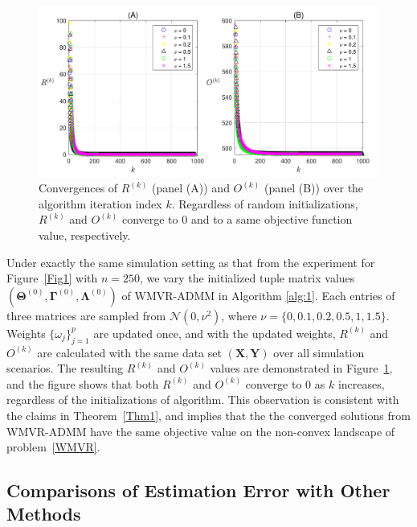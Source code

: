 \documentclass[alpha-refs]{wiley-article}
\begin{document}
\begin{figure} [t!]
  \includegraphics[width=120mm]{Figure/Fig4.pdf}
  \centering
  \caption{Convergences of $R^{(k)}$ (panel (A)) and $O^{(k)}$ (panel (B)) over the algorithm iteration index $k$.
  Regardless of random initializations, $R^{(k)}$ and $O^{(k)}$ converge to $0$ and to a same objective function value, respectively.}
  \label{Fig4}
\end{figure}

Under exactly the same simulation setting as that from the experiment for Figure~\ref{Fig1} with $n=250$, we vary the initialized tuple matrix values $(\boldsymbol{\Theta}^{(0)},\boldsymbol{\Gamma}^{(0)},\boldsymbol{\Lambda}^{(0)})$ of WMVR-ADMM in Algorithm \ref{alg:1}. Each entries of three matrices are sampled from $\mathcal{N}(0,\nu^{2})$, where $\nu=\{0,0.1,0.2,0.5,1,1.5\}$. Weights $\{\omega_j\}_{j=1}^{p}$ are updated once, and with the updated weights, $R^{(k)}$ and $O^{(k)}$ are calculated with the same data set $(\boldsymbol{X},\boldsymbol{Y})$ over all simulation scenarios. The resulting  $R^{(k)}$ and $O^{(k)}$ values are demonstrated in Figure~\ref{Fig4}, and the figure shows that both $R^{(k)}$ and $O^{(k)}$ converge to 0 as $k$ increases, regardless of the initializations of algorithm.  This observation is consistent with the claims in Theorem~\ref{Thm1}, and implies that the the converged solutions from WMVR-ADMM have the same objective value on the non-convex landscape of problem~\eqref{WMVR}.

\subsection{Comparisons of Estimation Error with Other Methods}
\end{document}

